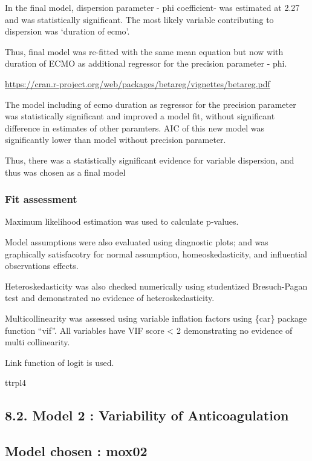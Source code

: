 \documentclass[
]{article}
\begin{document}
In the final model, dispersion parameter - phi coefficient- was
estimated at 2.27 and was statistically significant. The most likely
variable contributing to dispersion was `duration of ecmo'.

Thus, final model was re-fitted with the same mean equation but now with
duration of ECMO as additional regressor for the precision parameter -
phi.

\url{https://cran.r-project.org/web/packages/betareg/vignettes/betareg.pdf}

The model including of ecmo duration as regressor for the precision
parameter was statistically significant and improved a model fit,
without significant difference in estimates of other paramters. AIC of
this new model was significantly lower than model without precision
parameter.

Thus, there was a statistically significant evidence for variable
dispersion, and thus was chosen as a final model

\hypertarget{fit-assessment}{%
\subsubsection{Fit assessment}\label{fit-assessment}}

Maximum likelihood estimation was used to calculate p-values.

Model assumptions were also evaluated using diagnostic plots; and was
graphically satisfacotry for normal assumption, homeoskedasticity, and
influential observations effects.

Heteroskedasticity was also checked numerically using studentized
Bresuch-Pagan test and demonstrated no evidence of heteroskedasticity.

Multicollinearity was assessed using variable inflation factors using
\{car\} package function ``vif''. All variables have VIF score
\textless{} 2 demonstrating no evidence of multi collinearity.

Link function of logit is used.

ttrpl4

\hypertarget{model-2-variability-of-anticoagulation}{%
\subsection{8.2. Model 2 : Variability of
Anticoagulation}\label{model-2-variability-of-anticoagulation}}

\hypertarget{model-chosen-mox02}{%
\subsection{Model chosen : mox02}\label{model-chosen-mox02}}
\end{document}
